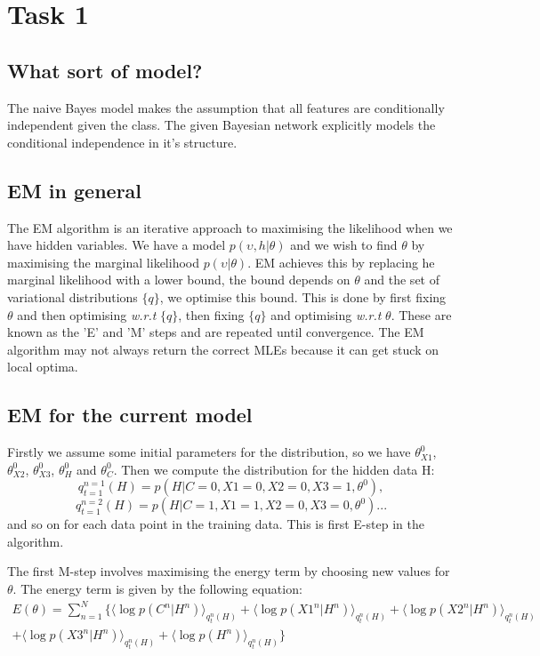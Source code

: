 \documentclass[12pt]{article} %
\begin{document}
\section{Task 1} %


\subsection{What sort of model?} %
The naive Bayes model makes the assumption that all features are conditionally independent given the class. The given Bayesian network explicitly models the conditional independence in it's structure.

\subsection{EM in general}
The EM algorithm is an iterative approach to maximising the likelihood when we have hidden variables. We have a model $p(\upsilon,h|\theta)$ and we wish to find $\theta$ by maximising the marginal likelihood $p(\upsilon|\theta)$. EM achieves this by replacing he marginal likelihood with a lower bound, the bound depends on $\theta$ and the set of variational distributions $\{q\}$, we optimise this bound. This is done by first fixing $\theta$ and then optimising \textit{w.r.t} $\{q\}$, then fixing $\{q\}$ and optimising \textit{w.r.t} $\theta$. These are known as the 'E' and 'M' steps and are repeated until convergence. The EM algorithm may not always return the correct MLEs because it can get stuck on local optima.

\subsection{EM for the current model}
Firstly we assume some initial parameters for the distribution, so we have $\theta_{X1}^0$, $\theta_{X2}^0$, $\theta_{X3}^0$, $\theta_{H}^0$ and $\theta_{C}^0$. Then we compute the distribution for the hidden data H:
$$
q_{t=1}^{n=1}(H)=p(H|C=0,X1=0,X2=0,X3=1,\theta^0),
$$
$$
q_{t=1}^{n=2}(H)=p(H|C=1,X1=1,X2=0,X3=0,\theta^0)...
$$
and so on for each data point in the training data. This is first E-step in the algorithm.

The first M-step involves maximising the energy term by choosing new values for $\theta$. The energy term is given by the following equation:
\begin{multline}
E(\theta) = \displaystyle\sum_{n=1}^{N}
\{
\langle\log p(C^n|H^n) \rangle_{q_t^n(H)} +
\langle\log p(X1^n|H^n) \rangle_{q_t^n(H)} + 
\langle\log p(X2^n|H^n) \rangle_{q_t^n(H)} \\ +
\langle\log p(X3^n|H^n) \rangle_{q_t^n(H)} + 
\langle\log p(H^n) \rangle_{q_t^n(H)}
\}
\end{multline}
\end{document}

